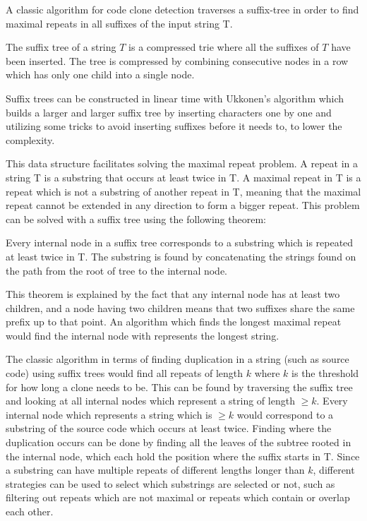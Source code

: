 A classic algorithm for code clone detection traverses a suffix-tree in order to find
maximal repeats in all suffixes of the input string T.

The suffix tree of a string $T$ is a compressed trie where all the suffixes of $T$ have been
inserted. The tree is compressed by combining consecutive nodes in a row which has
only one child into a single node. 

Suffix trees can be constructed in linear time with Ukkonen's algorithm which builds a
larger and larger suffix tree by inserting characters one by one and utilizing some tricks
to avoid inserting suffixes before it needs to, to lower the complexity. \cite{Ukkonen}

This data structure facilitates solving the maximal repeat problem. A repeat in a string T
is a substring that occurs at least twice in T. A maximal repeat in T is a repeat which is not
a substring of another repeat in T, meaning that the maximal repeat cannot be extended in
any direction to form a bigger repeat. This problem can be solved with a suffix tree using
the following theorem:

\begin{theorem}
    Every internal node in a suffix tree corresponds to a substring which is repeated at least
    twice in T. The substring is found by concatenating the strings found on the path from
    the root of tree to the internal node.
\end{theorem}

This theorem is explained by the fact that any internal node has at least two children, and a
node having two children means that two suffixes share the same prefix up to that point.
An algorithm which finds the longest maximal repeat would find the internal node with
represents the longest string. 

The classic algorithm\cite{Zibran_real_time_search, GodeIncrementalCloneDetection} in
terms of finding duplication in a string (such as source code) using suffix trees would
find all repeats of length $k$ where $k$ is the threshold for how long a clone needs to
be. This can be found by traversing the suffix tree and looking at all internal nodes
which represent a string of length $\geq k$. Every internal node which represents a string
which is $\geq k$ would correspond to a substring of the source code which occurs at least
twice. Finding where the duplication occurs can be done by finding all the leaves of the
subtree rooted in the internal node, which each hold the position where the suffix starts in
T. Since a substring can have multiple repeats of different lengths longer than $k$,
different strategies can be used to select which substrings are selected or not, such as
filtering out repeats which are not maximal or repeats which contain or overlap each other.


